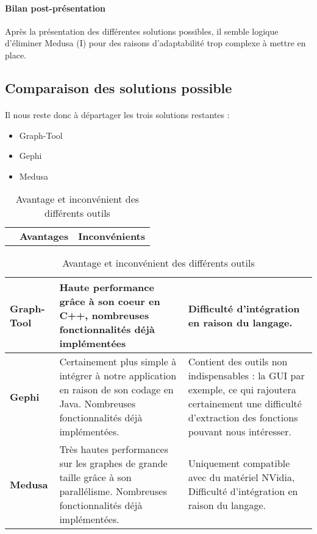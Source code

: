   \paragraph{Bilan post-présentation}
  Après la présentation des différentes solutions possibles, il semble logique d'éliminer  Medusa (I) pour des raisons d'adaptabilité trop complexe à mettre en place.
  
  \subsection{Comparaison des solutions possible}
  
  \paragraph{}
  Il nous reste donc à départager les trois solutions restantes : 
  \begin{itemize}
  	\item Graph-Tool
  	\item Gephi
  	\item Medusa
  \end{itemize}

    
    \begin{table}[H]
      
      \centering
    
    \begin{tabular}{p{3.5cm}  p{6cm}  p{6cm} }

	& \textbf{Avantages} 		& \textbf{Inconvénients}\\ 
    	
    \end{tabular}

    
    \begin{tabular}{|p{3.5cm} | p{6cm} | p{6cm} |}
      
      \hline
      \textbf{Graph-Tool} 	& Haute performance grâce à son coeur en C++, nombreuses fonctionnalités déjà implémentées	
				& Difficulté d'intégration en raison du langage. \\ \hline
      \textbf{Gephi} 		& Certainement plus simple à intégrer à notre application en raison de son codage en Java. Nombreuses fonctionnalités déjà implémentées.
				& Contient des outils non indispensables : la GUI par exemple, ce qui rajoutera certainement une difficulté d'extraction des fonctions pouvant nous intéresser. 	\\ \hline
      \textbf{Medusa} 		& Très hautes performances sur les graphes de grande taille grâce à son parallélisme. Nombreuses fonctionnalités déjà implémentées.
				& Uniquement compatible avec du matériel NVidia, Difficulté d'intégration en raison du langage.	\\ \hline
    \end{tabular}

    \caption{Avantage et inconvénient des différents outils }
  \end{table}
  
